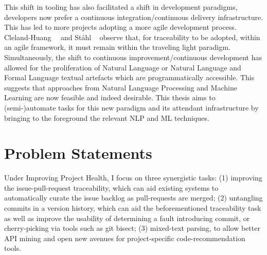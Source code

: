 This shift in tooling has also facilitated a shift in development paradigms,
developers now prefer a continuous integration/continuous delivery
infrastructure. This has led to more projects adopting a more agile development
process. Cleland-Huang~\etal~\cite{Cleland-Huang2014} and St{\aa}hl
\etal~\cite{Stahl2017} observe that, for traceability to be adopted, within an
agile framework, it must remain within the traveling light paradigm.
Simultaneously, the shift to continuous improvement/continuous development has
allowed for the proliferation of Natural Language or Natural Language and Formal
Language textual artefacts which are programmatically accessible. This suggests
that approaches from Natural Language Processing and Machine Learning are now
feasible and indeed desirable. This thesis aims to (semi-)automate tasks for
this new paradigm and its attendant infrastructure by bringing to the foreground
the relevant NLP and ML techniques.

\section{Problem Statements}
\label{chapter:introduction:sec:problem_statement}

Under Improving Project Health, I focus on three synergistic tasks: (1)
improving the issue-pull-request traceability, which can aid existing systems to
automatically curate the issue backlog as pull-requests are merged; (2)
untangling commits in a version history, which can aid the beforementioned
traceability task as well as improve the usability of determining a fault
introducing commit, or cherry-picking via tools such as git bisect; (3)
mixed-text parsing, to allow better API mining and open new avenues for
project-specific code-recommendation tools. 

